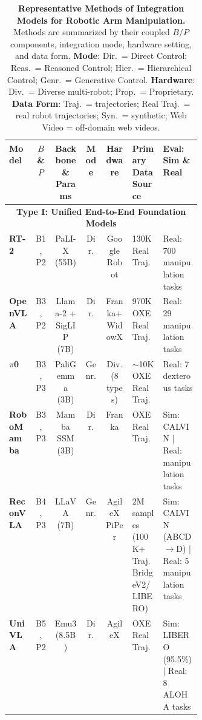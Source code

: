 \documentclass[acmsmall,screen,review]{acmart}
\begin{document}
\begin{table}[t!]
\centering
\caption{\textbf{Representative Methods of Integration Models for Robotic Arm Manipulation.}
Methods are summarized by their coupled \(B/P\) components, integration mode, hardware setting, and data form.
\textbf{Mode}: Dir.\ = Direct Control; Reas.\ = Reasoned Control; Hier.\ = Hierarchical Control; Genr.\ = Generative Control.
\textbf{Hardware}: Div.\ = Diverse multi-robot; Prop.\ = Proprietary.
\textbf{Data Form}: Traj.\ = trajectories; Real Traj.\ = real robot trajectories; Syn.\ = synthetic; Web Video = off-domain web videos.}\label{tab:integration_methods}
\renewcommand{\arraystretch}{1.2}
\setlength{\tabcolsep}{3pt}
\scriptsize

\begin{tabular}{
  l
  c
  c
  c
  c
  p{0.168\linewidth}
  p{0.205\linewidth}
}
\toprule
\textbf{Model} &
\textbf{\(B\) \& \(P\)} &
\textbf{Backbone \& Params} &
\textbf{Mode} &
\textbf{Hardware} &
\textbf{Primary Data Source} &
\textbf{Eval: Sim \& Real} \\
\midrule

\multicolumn{7}{c}{\textbf{Type I\@: Unified End-to-End Foundation Models}} \\
\midrule

\textbf{RT-2}~\cite{brohan2023rt2} & B1, P2 & PaLI-X (55B) & Dir. & Google Robot & 130K Real Traj. & Real: 700 manipulation tasks \\

\textbf{OpenVLA}~\cite{kim2024openvla} & B3, P2 & Llama-2 + SigLIP (7B) & Dir. & Franka+WidowX & 970K OXE Real Traj. & Real: 29 manipulation tasks \\

\textbf{$\pi$0}~\cite{black2024pi0} & B3, P3 & PaliGemma (3B) & Genr. & Div. (8 types) & $\sim$10K OXE Real Traj. & Real: 7 dexterous tasks \\

\textbf{RoboMamba}~\cite{liu2024robomamba} & B3, P3 & Mamba SSM (3B) & Dir. & Franka & OXE Real Traj. & Sim: CALVIN | Real: manipulation tasks \\

\textbf{ReconVLA}~\cite{song2025reconvla} & B4, P3 & LLaVA (7B) & Genr. & AgileX PiPer & 2M samples (100K+ Traj. BridgeV2/LIBERO) & Sim: CALVIN (ABCD$\rightarrow$D) | Real: 5 manipulation tasks \\

\textbf{UniVLA}~\cite{wang2026unified} & B5, P2 & Emu3 (8.5B) & Dir. & AgileX & OXE Real Traj. & Sim: LIBERO (95.5\%) | Real: 8 ALOHA tasks\\


\end{tabular}
\end{table}
\end{document}
